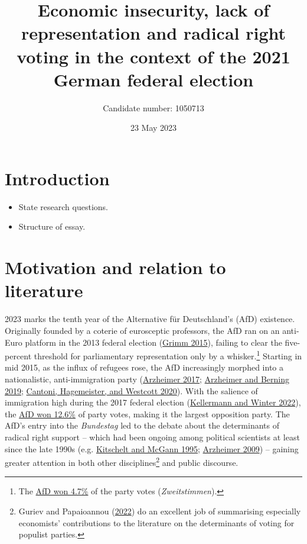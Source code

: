 \documentclass[
]{article}
\title{Economic insecurity, lack of representation and radical right
voting in the context of the 2021 German federal election}
\author{Candidate number: 1050713}
\date{23 May 2023}
\begin{document}
\maketitle

\hypertarget{introduction}{%
\section{Introduction}\label{introduction}}

\begin{itemize}
\item
  State research questions.
\item
  Structure of essay.
\end{itemize}

\hypertarget{motivation}{%
\section{Motivation and relation to literature}\label{motivation}}

2023 marks the tenth year of the Alternative für Deutschland's (AfD)
existence. Originally founded by a coterie of eurosceptic professors,
the AfD ran on an anti-Euro platform in the 2013 federal election
(\protect\hyperlink{ref-grimm_rise_2015}{Grimm 2015}), failing to clear
the five-percent threshold for parliamentary representation only by a
whisker.\footnote{The
  \href{https://www.bundeswahlleiterin.de/bundestagswahlen/2013/ergebnisse/bund-99.html}{AfD
  won 4.7\%} of the party votes (\emph{Zweitstimmen}).} Starting in mid
2015, as the influx of refugees rose, the AfD increasingly morphed into
a nationalistic, anti-immigration party
(\protect\hyperlink{ref-arzheimer_alternative_2017}{Arzheimer 2017};
\protect\hyperlink{ref-arzheimer_how_2019}{Arzheimer and Berning 2019};
\protect\hyperlink{ref-cantoni_persistence_2020}{Cantoni, Hagemeister,
and Westcott 2020}). With the salience of immigration high during the
2017 federal election
(\protect\hyperlink{ref-kellermann_immigration_2022}{Kellermann and
Winter 2022}), the
\href{https://www.bundeswahlleiterin.de/info/presse/mitteilungen/bundestagswahl-2017/34_17_endgueltiges_ergebnis.html}{AfD
won 12.6\%} of party votes, making it the largest opposition party. The
AfD's entry into the \emph{Bundestag} led to the debate about the
determinants of radical right support -- which had been ongoing among
political scientists at least since the late 1990s (e.g.
\protect\hyperlink{ref-kitschelt_radical_1995}{Kitschelt and McGann
1995}; \protect\hyperlink{ref-arzheimer_contextual_2009}{Arzheimer
2009}) -- gaining greater attention in both other disciplines\footnote{Guriev
  and Papaioannou (\protect\hyperlink{ref-guriev_political_2022}{2022})
  do an excellent job of summarising especially economists'
  contributions to the literature on the determinants of voting for
  populist parties.} and public discourse.
\end{document}
